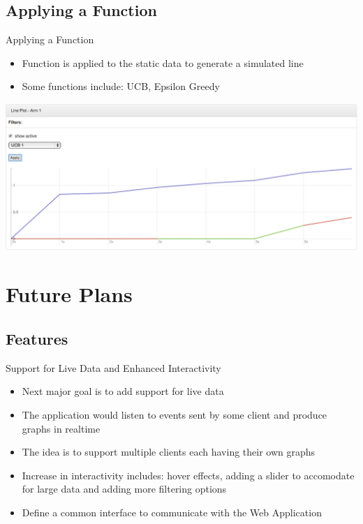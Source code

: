 \documentclass{beamer}
\begin{document}
\subsection{Applying a Function}
\begin{frame}{Applying a Function}
\begin{itemize}
\item Function is applied to the static data to generate a simulated line
\item Some functions include: UCB, Epsilon Greedy
\end{itemize}
\includegraphics[scale=0.25]{linechartfunction.png}
\end{frame}

\section{Future Plans}

\subsection{Features }
\begin{frame}{Support for Live Data and Enhanced Interactivity}
\begin{itemize}
\item Next major goal is to add support for live data
\item The application would listen to events sent by some client and produce graphs in realtime
\item The idea is to support multiple clients each having their own graphs
\item Increase in interactivity includes: hover effects, adding a slider to accomodate for large data and adding more filtering options
\item Define a common interface to communicate with the Web Application
\end{itemize}
\end{frame}
\end{document}
